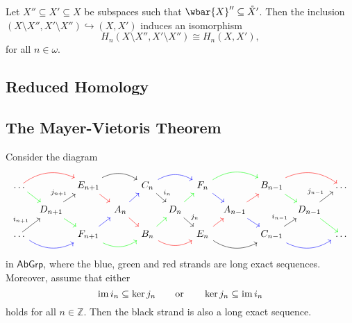 \begin{theorem}
	Let $X'' \subseteq X' \subseteq X$ be subspaces such that $\wbar{X}'' \subseteq \mathring{X}'$. Then the inclusion $(X\setminus X'',X' \setminus X'') \hookrightarrow (X,X')$ induces an isomorphism
	\begin{equation*}
		H_n(X\setminus X'',X' \setminus X'') \cong H_n(X,X'),
	\end{equation*}
	\noindent for all $n \in \omega$.
\end{theorem}

\subsection*{Reduced Homology}


\subsection*{The Mayer-Vietoris Theorem}

\begin{proposition}
	\label{prop:commutative_braid}
	Consider the diagram
	\begin{equation*}
		\begin{tikzcd}[column sep=1.5ex, row sep=2ex]
			\dots \arrow[dr,green]\arrow[rr,red, bend left] & & E_{n + 1}\arrow[rr,bend left]\arrow[dr,red] & & C_n \arrow[rr,blue,bend left]\arrow[dr,"i_n"] & & F_n \arrow[rr,green,bend left]\arrow[dr,blue] & & B_{n - 1}\arrow[dr,green]\arrow[rr,bend left,red] & & \dots\\
			& D_{n + 1} \arrow[ur,"j_{n + 1}"]\arrow[dr,green] & & A_n \arrow[dr,red]\arrow[ur,blue] & & D_n \arrow[dr,"j_n"]\arrow[ur,green] & & A_{n - 1}\arrow[dr,blue]\arrow[ur,red] & & D_{n - 1} \arrow[dr,green]\arrow[ur,"j_{n - 1}"]\\
			\dots \arrow[ur,"i_{n + 1}"]\arrow[rr,blue,bend right] & & F_{n + 1} \arrow[ur,blue]\arrow[rr,bend right, green] & & B_n \arrow[rr,bend right,red]\arrow[ur,green] & & E_n \arrow[rr,bend right]\arrow[ur,red] & & C_{n - 1}\arrow[rr,bend right, blue]\arrow[ur,"i_{n - 1}"] & & \dots
		\end{tikzcd}
	\end{equation*}
	\noindent in $\mathsf{AbGrp}$, where the blue, green and red strands are long exact sequences. Moreover, assume that either
	\begin{equation*}
		\operatorname{im} i_n \subseteq \ker j_n \qquad \text{or} \qquad \ker j_n \subseteq \operatorname{im} i_n
	\end{equation*}
	\noindent holds for all $n \in \mathbb{Z}$. Then the black strand is also a long exact sequence.
\end{proposition}

